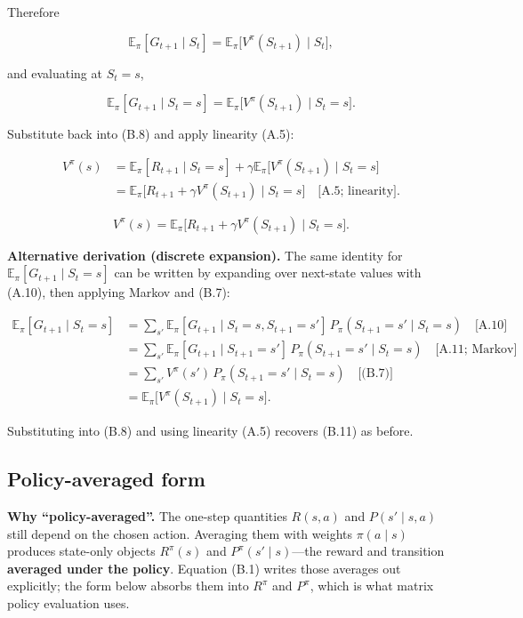 Therefore

\[
\mathbb{E}_\pi[G_{t+1}\mid S_t]
=
\mathbb{E}_\pi\bigl[V^\pi(S_{t+1})\mid S_t\bigr],
\]

and evaluating at $S_t=s$,

\[
\mathbb{E}_\pi[G_{t+1}\mid S_t=s]
=
\mathbb{E}_\pi\bigl[V^\pi(S_{t+1})\mid S_t=s\bigr].
\]

Substitute back into (B.8) and apply linearity (A.5):

\[
\begin{aligned}
V^\pi(s)
&=
\mathbb{E}_\pi[R_{t+1}\mid S_t=s]
+
\gamma
\mathbb{E}_\pi\bigl[V^\pi(S_{t+1})\mid S_t=s\bigr]
\\
&=
\mathbb{E}_\pi\bigl[R_{t+1}+\gamma V^\pi(S_{t+1})\mid S_t=s\bigr]
\quad\text{[A.5; linearity]}.
\end{aligned}
\]

\begin{equation}
\boxed{
V^\pi(s)
=
\mathbb{E}_\pi\bigl[R_{t+1}+\gamma V^\pi(S_{t+1})\mid S_t=s\bigr].
}
\tag{B.11}\label{eq:B.11}
\end{equation}

\textbf{Alternative derivation (discrete expansion).} The same identity for $\mathbb{E}_\pi[G_{t+1}\mid S_t=s]$ can be written by expanding over next-state values with (A.10), then applying Markov and (B.7):

\[
\begin{aligned}
\mathbb{E}_\pi[G_{t+1}\mid S_t=s]
&=
\sum_{s'}
\mathbb{E}_\pi[G_{t+1}\mid S_t=s,S_{t+1}=s']
\,
P_\pi(S_{t+1}=s'\mid S_t=s)
\quad\text{[A.10]}
\\
&=
\sum_{s'}
\mathbb{E}_\pi[G_{t+1}\mid S_{t+1}=s']
\,
P_\pi(S_{t+1}=s'\mid S_t=s)
\quad\text{[A.11; Markov]}
\\
&=
\sum_{s'}
V^\pi(s')
\,
P_\pi(S_{t+1}=s'\mid S_t=s)
\quad\text{[(B.7)]}
\\
&=
\mathbb{E}_\pi\bigl[V^\pi(S_{t+1})\mid S_t=s\bigr].
\end{aligned}
\]

Substituting into (B.8) and using linearity (A.5) recovers (B.11) as before.

\subsection{Policy-averaged form}

\textbf{Why ``policy-averaged''.} The one-step quantities $R(s,a)$ and $P(s'\mid s,a)$ still depend on the chosen action. Averaging them with weights $\pi(a\mid s)$ produces state-only objects $R^\pi(s)$ and $P^\pi(s'\mid s)$---the reward and transition \textbf{averaged under the policy}. Equation (B.1) writes those averages out explicitly; the form below absorbs them into $R^\pi$ and $P^\pi$, which is what matrix policy evaluation uses.

